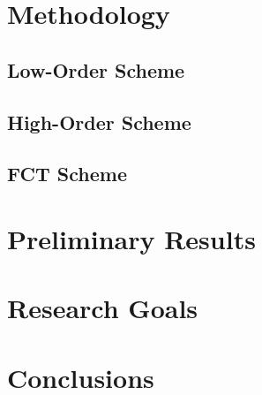 \documentclass[12pt]{article}
\newcommand{\refdir}{../dissertation}
\begin{document}
\section{Methodology\label{sec:methodology}}
\subsection{Low-Order Scheme\label{sec:low_order_scheme}}


\subsection{High-Order Scheme\label{sec:high_order_scheme}}


\subsection{FCT Scheme\label{sec:fct_scheme}}


\section{Preliminary Results\label{sec:results}}


\section{Research Goals\label{sec:goals}}


\section{Conclusions\label{sec:conclusions}}




\end{document}
